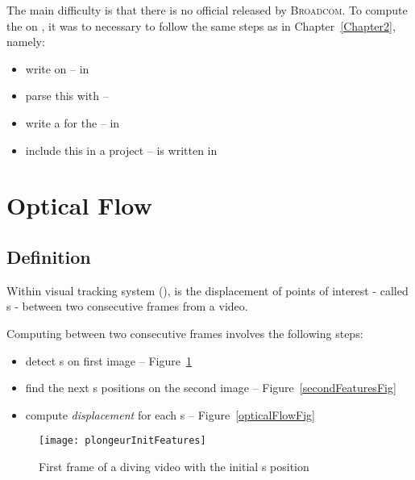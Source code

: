 The main difficulty is that there is no official \api{} released by \textsc{Broadcom}. To compute the \flow{} on \rasp, it was to necessary to follow the same steps as in Chapter~\ref{Chapter2}, namely:
\begin{itemize}
	\item write  on  -- in 
	\item parse this  with  -- 
	\item write a  for the  -- in 
	\item include this \api{} in a  project --  is written in 
\end{itemize}


\section{Optical Flow}

\subsection{Definition}

Within \iBubble{} visual tracking system (), \flow{} is the displacement of points of interest - called \feat{}s - between two consecutive frames from a video.

Computing \flow{} between two consecutive frames involves the following steps:
\begin{itemize}
	\item detect \feat{}s on first image -- Figure~\ref{initFeaturesFig}
	\item find the next \feat{}s positions on the second image -- Figure~\ref{secondFeaturesFig}
	\item compute \emph{displacement} for each \feat{}s -- Figure~\ref{opticalFlowFig}
\end{itemize}


\begin{figure}[!htbp]
	\centering
	\texttt{[image: plongeurInitFeatures]}
	\caption{First frame of a diving video with the initial \feat{}s position}
	\label{initFeaturesFig}
\end{figure}
\FloatBarrier



